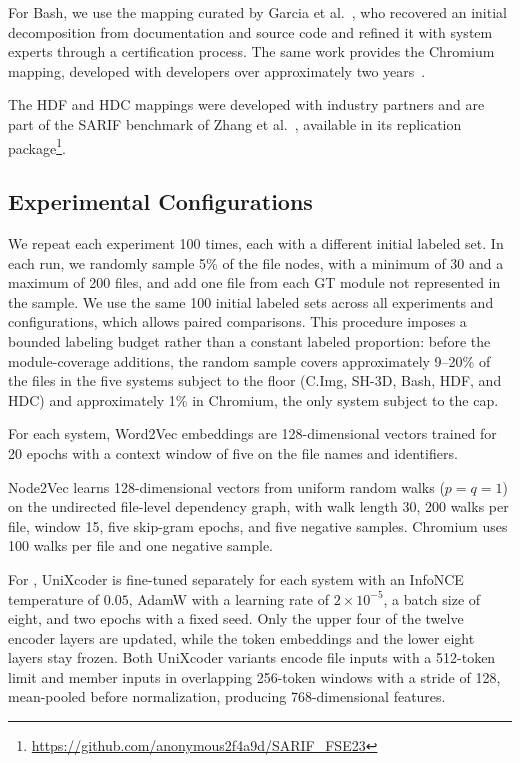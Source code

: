 For Bash, we use the mapping curated by Garcia et al.~\cite{garcia2013}, who recovered an initial decomposition from documentation and source code and refined it with system experts through a certification process. The same work provides the Chromium mapping, developed with developers over approximately two years~\cite{deps_impact}.

The HDF and HDC mappings were developed with industry partners and are part of the SARIF benchmark of Zhang et al.~\cite{sarif}, available in its replication package\footnote{\label{fnsarif}\href{https://github.com/anonymous2f4a9d/SARIF_FSE23/tree/main}{https://github.com/anonymous2f4a9d/SARIF\_FSE23}}.

\subsection{Experimental Configurations}

We repeat each experiment 100 times, each with a different initial labeled set. In each run, we randomly sample 5\% of the file nodes, with a minimum of 30 and a maximum of 200 files, and add one file from each GT module not represented in the sample. We use the same 100 initial labeled sets across all experiments and configurations, which allows paired comparisons. This procedure imposes a bounded labeling budget rather than a constant labeled proportion: before the module-coverage additions, the random sample covers approximately 9--20\% of the files in the five systems subject to the floor (C.Img, SH-3D, Bash, HDF, and HDC) and approximately 1\% in Chromium, the only system subject to the cap.

For each system, Word2Vec embeddings are 128-dimensional vectors trained for 20 epochs with a context window of five on the file names and identifiers.

Node2Vec learns 128-dimensional vectors from uniform random walks ($p=q=1$) on the undirected file-level dependency graph, with walk length 30, 200 walks per file, window 15, five skip-gram epochs, and five negative samples. Chromium uses 100 walks per file and one negative sample.

For \ft{}, UniXcoder is fine-tuned separately for each system with an InfoNCE temperature of $0.05$, AdamW with a learning rate of $2\times10^{-5}$, a batch size of eight, and two epochs with a fixed seed. Only the upper four of the twelve encoder layers are updated, while the token embeddings and the lower eight layers stay frozen. Both UniXcoder variants encode file inputs with a 512-token limit and member inputs in overlapping 256-token windows with a stride of 128, mean-pooled before normalization, producing 768-dimensional features.

